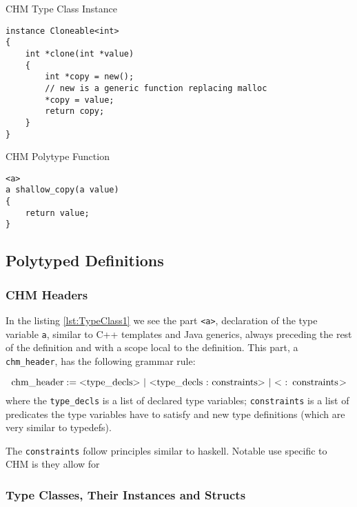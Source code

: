 \begin{listing}
\caption{CHM Type Class Instance}
\label{lst:Instance}
\begin{lstlisting}
instance Cloneable<int>
{
    int *clone(int *value)
    {
        int *copy = new();
        // new is a generic function replacing malloc
        *copy = value;
        return copy;
    }
}
\end{lstlisting}
\end{listing}

\begin{listing}
\caption{CHM Polytype Function}
\label{lst:Function}
\begin{lstlisting}
<a>
a shallow_copy(a value)
{
    return value;
}
\end{lstlisting}
\end{listing}

\subsection{Polytyped Definitions}


\subsubsection{CHM Headers}
In the listing \ref{lst:TypeClass1} we see the part \lstinline{<a>}, declaration of the type variable \lstinline{a}, similar to C++ templates and Java generics, always preceding the rest of the definition and with a scope local to the definition. This part, a \lstinline{chm_header}, has the following grammar rule:

\begin{defn}
    $$\text{\lstinline{chm_header}} := \text{\lstinline{<type_decls>}}\ |\ \text{\lstinline{<type_decls : constraints>}}\ |\ \text{\lstinline{< : constraints>}}$$
    where the \lstinline{type_decls} is a list of declared type variables; \lstinline{constraints} is a list of predicates the type variables have to satisfy and new type definitions (which are very similar to typedefs).
\end{defn}

The \lstinline{constraints} follow principles similar to haskell. Notable use specific to CHM is they allow for

\subsubsection{Type Classes, Their Instances and Structs}

